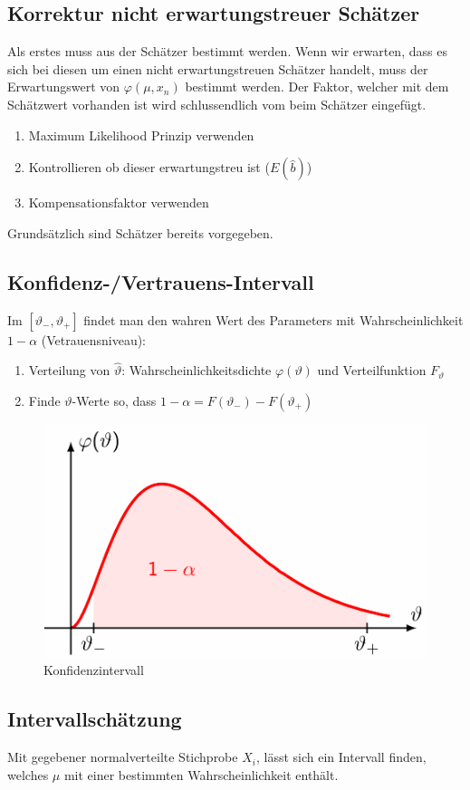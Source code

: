 \documentclass[../Main.tex]{subfiles}
\begin{document}
\subsection{Korrektur nicht erwartungstreuer Schätzer}
Als erstes muss aus der Schätzer bestimmt werden. Wenn wir erwarten, dass
es sich bei diesen um einen nicht erwartungstreuen Schätzer handelt, muss
der Erwartungswert von \(\varphi(\mu,x_n)\) bestimmt werden. Der Faktor,
welcher mit dem Schätzwert vorhanden ist wird schlussendlich vom beim 
Schätzer eingefügt.
\begin{enumerate}
    \item Maximum Likelihood Prinzip verwenden
    \item Kontrollieren ob dieser erwartungstreu ist (\(E(\hat{b})\))
    \item Kompensationsfaktor verwenden
\end{enumerate}
Grundsätzlich sind Schätzer bereits vorgegeben.

\subsection{Konfidenz-/Vertrauens-Intervall}
Im \([\vartheta_-,\vartheta_+]\) findet man den wahren Wert des
Parameters mit Wahrscheinlichkeit \(1-\alpha\) (Vetrauensniveau):
\begin{enumerate}
    \item Verteilung von \(\hat{\vartheta}\): Wahrscheinlichkeitsdichte
    \(\varphi(\vartheta)\) und Verteilfunktion \(F_\vartheta\)
    \item Finde \(\vartheta\)-Werte so, dass \(1-\alpha=F(\vartheta_-)-F(\vartheta_+)\)
\end{enumerate}

\begin{figure}[H]
    \centering
    \includegraphics[width=0.5\linewidth]{Images/konfidenzintervall.png}
    \caption{Konfidenzintervall}
\end{figure}



\subsection{Intervallschätzung}
Mit gegebener normalverteilte Stichprobe \(X_i\), lässt sich ein
Intervall finden, welches \(\mu\) mit einer bestimmten Wahrscheinlichkeit enthält.
\end{document}
